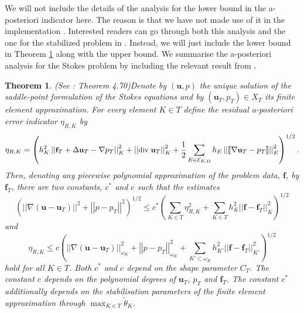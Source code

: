 \documentclass[12pt,a4paper]{article}
\newtheorem{theorem}{Theorem}[section]
\theoremstyle{definition}
\begin{document}
We will not include the details of the analysis for the lower bound in the a-posteriori indicator here.  The reason is that we have not made use of it in the implementation .  Interested readers can go through both this analysis and the one for the stabilized problem in \cite[\S 4.10.3]{verfurth2013posteriori}.  Instead, we will just include the lower bound in Theorem \ref{verf_theorem_apost_err_ind} along with the upper bound.  We summarise the a-posteriori analysis for the Stokes problem by including the relevant result from \cite{verfurth2013posteriori}.
\begin{theorem}{(See \cite[\S4.10.3]{verfurth2013posteriori}: Theorem 4.70)}\label{verf_theorem_apost_err_ind}
Denote by $\left(\textbf{u},p\right)$ the unique solution of the saddle-point formulation of the Stokes equations and by $\left(\textbf{u}_T,p_T\right)\in X_T$ its finite element approximation.  For every element $K\in T$ define the residual a-posteriori error indicator $\eta_{R,K}$ by
\begin{equation}\small\label{a_posteriori_ind_stokes}
\eta_{R,K}=\left(h^2_K\left|\left|\textbf{f}_T+\Delta \textbf{u}_T-\nabla p_T\right|\right|^2_K+\left|\left|\text{div } \textbf{u}_T\right|\right|^2_K+\frac{1}{2}\sum_{E\in\mathcal{E}_{K,\Omega}}h_E\left|\left| \llbracket \nabla \textbf{u}_T -p_T \rrbracket \right|\right|_E^2\right)^{1/2}.\nonumber
\end{equation}
Then, denoting any piecewise polynomial approximation of the problem data, $\textbf{f}$, by $\textbf{f}_T$, there are two constants, $c^*$ and $c$ such that the estimates
\begin{equation}\nonumber
\left(\left|\left|\nabla\left(\textbf{u}-\textbf{u}_T\right)\right|\right|^2+\left|\left|p-p_T\right|\right|^2\right)^{1/2}\leq c^*\left(\sum_{K\in T}\eta^2_{R,K}+\sum_{K\in T}h^2_K\left|\left|\textbf{f}-\textbf{f}_T\right|\right|^2_K\right)^{1/2}
\end{equation}
and
\begin{equation}\nonumber
\eta_{R,K}\leq c \left(\left|\left|\nabla\left(\textbf{u}-\textbf{u}_T\right)\right|\right|_{\omega_K}^2+\left|\left|p-p_T\right|\right|_{\omega_K}^2+\sum_{K'\subset \omega_K}h^2_{K'}\left|\left|\textbf{f}-\textbf{f}_T\right|\right|^2_{K'}\right)^{1/2}
\end{equation}
hold for all $K\in T$.  Both $c^*$ and $c$ depend on the shape parameter $C_T$.  The constant $c$ depends on the polynomial degrees of $\textbf{u}_T$, $p_T$ and $\textbf{f}_T$.  The constant $c^*$ additionally depends on the stabilisation parameters of the finite element approximation through $\max_{K\in T}\widetilde{\theta}_K$.
\end{theorem}
\end{document}
